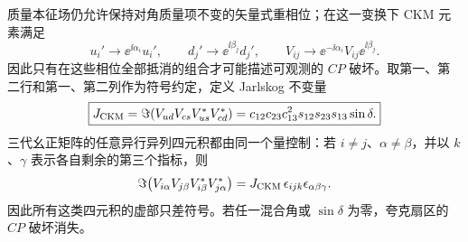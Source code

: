 \begin{definition}[重相位不变量]
质量本征场仍允许保持对角质量项不变的矢量式重相位；在这一变换下 CKM 元素满足
\begin{equation}
\boxed{
 u_i'\to \ee^{\ii\alpha_i}u_i',\qquad
 d_j'\to \ee^{\ii\beta_j}d_j',\qquad
 V_{ij}\to \ee^{-\ii\alpha_i}V_{ij}\ee^{\ii\beta_j}.}
\label{eq:ckm-rephasing-dp68}
\end{equation}
因此只有在这些相位全部抵消的组合才可能描述可观测的 $CP$ 破坏。取第一、第二行和第一、第二列作为符号约定，定义 Jarlskog 不变量
\begin{equation}
 \boxed{
 J_{\rm CKM}
 =\Im\!\left(V_{ud}V_{cs}V_{us}^*V_{cd}^*\right)
 =c_{12}c_{23}c_{13}^2s_{12}s_{23}s_{13}\sin\delta.}
 \label{eq:jarlskog-dp11}
\end{equation}
三代幺正矩阵的任意异行异列四元积都由同一个量控制：若 $i\neq j$、$\alpha\neq\beta$，并以 $k$、$\gamma$ 表示各自剩余的第三个指标，则
\begin{equation*}
 \Im\!\left(V_{i\alpha}V_{j\beta}V_{i\beta}^*V_{j\alpha}^*\right)
 =J_{\rm CKM}\,\epsilon_{ijk}\epsilon_{\alpha\beta\gamma}.
\end{equation*}
因此所有这类四元积的虚部只差符号。若任一混合角或 $\sin\delta$ 为零，夸克扇区的 $CP$ 破坏消失。

\end{definition}

